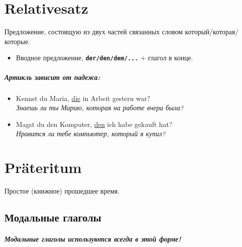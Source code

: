 \documentclass[12pt,a4paper]{report}
\newcommand{\term}[1]{\texttt{\textbf{#1}}}
\newcommand{\satzew}[1]{\underline{#1}}
\newcommand{\ubersatze}[1]{\textit{#1}}
\begin{document}

\newpage

\chapter{Relativesatz}

Предложение, состоящую из двух частей связанных словом который/которая/которые. 

\begin{itemize}
 \item Вводное предложение, \term{der/den/dem/...} + глагол в конце.
\end{itemize}

\paragraph{Артикль зависит от падежа:}
\begin{itemize}
 \item Kennst du Maria, \satzew{die} in Arbeit gestern war? 
 ~\\ \ubersatze{Знаешь ли ты Марию, которая на работе вчера была?}
 \item Magst du den Komputer, \satzew{den} ich habe gekauft hat? 
 ~\\ \ubersatze{Нравится ли тебе компьютер, который я купил?}
\end{itemize}

\chapter{Präteritum}

Простое (книжное) прошедшее время. 

\section{Модальные глаголы}

\paragraph{Модальные глаголы используются всегда в этой форме!}
\end{document}
